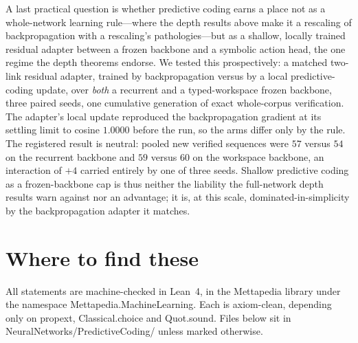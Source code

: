 \documentclass[11pt]{article}
\newcommand{\leanname}[1]{{\scriptsize\ttfamily
  \def\_{\textunderscore\allowbreak}#1}}
\begin{document}
A last practical question is whether predictive coding earns a place not as a whole-network
learning rule---where the depth results above make it a rescaling of backpropagation with a
rescaling's pathologies---but as a shallow, locally trained residual adapter between a
frozen backbone and a symbolic action head, the one regime the depth theorems endorse. We
tested this prospectively: a matched two-link residual adapter, trained by backpropagation
versus by a local predictive-coding update, over \emph{both} a recurrent and a typed-workspace
frozen backbone, three paired seeds, one cumulative generation of exact whole-corpus
verification. The adapter's local update reproduced the backpropagation gradient at its
settling limit to cosine $1.0000$ before the run, so the arms differ only by the rule. The
registered result is neutral: pooled new verified sequences were $57$ versus $54$ on the
recurrent backbone and $59$ versus $60$ on the workspace backbone, an interaction of $+4$
carried entirely by one of three seeds. Shallow predictive coding as a frozen-backbone cap
is thus neither the liability the full-network depth results warn against nor an advantage;
it is, at this scale, dominated-in-simplicity by the backpropagation adapter it matches.

\section*{Where to find these}

All statements are machine-checked in Lean~4, in the Mettapedia library under the
namespace \leanname{Mettapedia.MachineLearning}. Each is axiom-clean, depending only on
\leanname{propext}, \leanname{Classical.choice} and \leanname{Quot.sound}. Files below sit
in \leanname{NeuralNetworks/PredictiveCoding/} unless marked otherwise.
\end{document}
